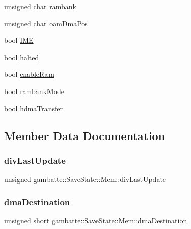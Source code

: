 \begin{DoxyCompactItemize}
\item 
unsigned char \hyperlink{structgambatte_1_1SaveState_1_1Mem_ac46eb550a4acc2aabef2ffe323a6cd24}{rambank}
\item 
unsigned char \hyperlink{structgambatte_1_1SaveState_1_1Mem_ad812f46789a25f4e39ae31dd0cdc1236}{oam\+Dma\+Pos}
\item 
bool \hyperlink{structgambatte_1_1SaveState_1_1Mem_af09eedb50f5dd691378612fd20fa4b39}{I\+ME}
\item 
bool \hyperlink{structgambatte_1_1SaveState_1_1Mem_a28cc6ab288d5c84e3c4140e3a72f742d}{halted}
\item 
bool \hyperlink{structgambatte_1_1SaveState_1_1Mem_a7f01ccf9678dc61ca5b1db4e3733e6c6}{enable\+Ram}
\item 
bool \hyperlink{structgambatte_1_1SaveState_1_1Mem_adee0625c6943456a851d73eb3aed4245}{rambank\+Mode}
\item 
bool \hyperlink{structgambatte_1_1SaveState_1_1Mem_a888b5a886f68c63ddb78ec2c1b95b343}{hdma\+Transfer}
\end{DoxyCompactItemize}


\subsection{Member Data Documentation}
\mbox{\label{structgambatte_1_1SaveState_1_1Mem_adfc72668409f448501f371c52c01d060}} 
\subsubsection{\texorpdfstring{div\+Last\+Update}{divLastUpdate}}
{\footnotesize\ttfamily unsigned gambatte\+::\+Save\+State\+::\+Mem\+::div\+Last\+Update}

\mbox{\label{structgambatte_1_1SaveState_1_1Mem_ab74c2e63ce1d0eec213133583e7d55f7}} 
\subsubsection{\texorpdfstring{dma\+Destination}{dmaDestination}}
{\footnotesize\ttfamily unsigned short gambatte\+::\+Save\+State\+::\+Mem\+::dma\+Destination}

